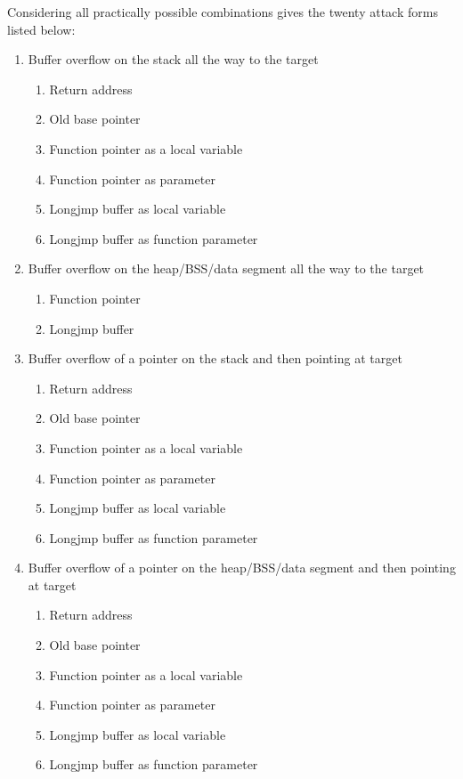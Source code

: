 Considering all practically possible combinations gives the twenty attack forms listed below:

\begin{enumerate}

\item Buffer overflow on the stack all the way to the target

  \begin{enumerate}
  \item Return address
  \item Old base pointer
  \item Function pointer as a local variable
  \item Function pointer as parameter
  \item Longjmp buffer as local variable
  \item Longjmp buffer as function parameter
  \end{enumerate}

\item Buffer overflow on the heap/BSS/data segment all the way to the target

  \begin{enumerate}
  \item Function pointer
  \item Longjmp buffer
  \end{enumerate}

\item Buffer overflow of a pointer on the stack and then pointing at target

  \begin{enumerate}
  \item Return address
  \item Old base pointer
  \item Function pointer as a local variable
  \item Function pointer as parameter
  \item Longjmp buffer as local variable
  \item Longjmp buffer as function parameter
  \end{enumerate}

\item Buffer overflow of a pointer on the heap/BSS/data segment and then pointing at target

  \begin{enumerate}
  \item Return address
  \item Old base pointer
  \item Function pointer as a local variable
  \item Function pointer as parameter
  \item Longjmp buffer as local variable
  \item Longjmp buffer as function parameter
  \end{enumerate}

\end{enumerate}

